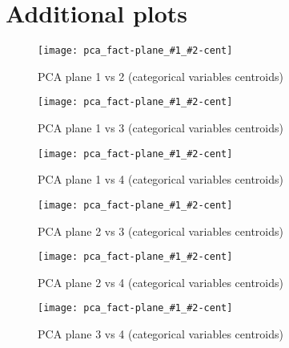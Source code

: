 

\section{Additional plots}%
\label{sec:additional_plots}

\newcommand{\centroidmap}[2]{
    \begin{figure}[H]
        \centering
        \texttt{[image: pca\_fact-plane\_\#1\_\#2-cent]}
        \caption{PCA plane #1 vs #2 (categorical variables centroids)}%
        \label{fig:plane_#1-#2-cent}
    \end{figure}
}

\begin{landscape}
\centroidmap{1}{2}
\centroidmap{1}{3}
\centroidmap{1}{4}
\centroidmap{2}{3}
\centroidmap{2}{4}
\centroidmap{3}{4}
\end{landscape}


%
%
%

